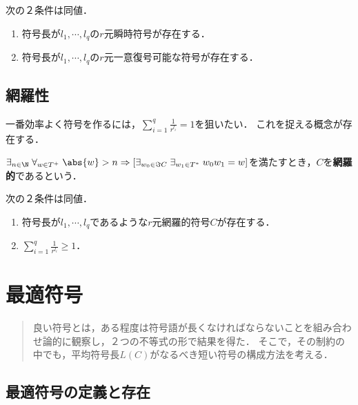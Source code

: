 \documentclass[uplatex,dvipdfmx]{jsreport}
\begin{document}
\begin{corollary}\mbox{}
    次の２条件は同値．
    \begin{enumerate}
        \item 符号長が$l_1,\cdots,l_q$の$r$元瞬時符号が存在する．
        \item 符号長が$l_1,\cdots,l_q$の$r$元一意復号可能な符号が存在する．
    \end{enumerate}
\end{corollary}

\section{網羅性}

\begin{tcolorbox}[colframe=ForestGreen, colback=ForestGreen!10!white,breakable,colbacktitle=ForestGreen!40!white,coltitle=black,fonttitle=\bfseries\sffamily,
title=]
    一番効率よく符号を作るには，$\sum^q_{i=1}\frac{1}{r^{l_i}}= 1$を狙いたい．
    これを捉える概念が存在する．
\end{tcolorbox}

\begin{definition}[exhaustive]
    $\exists_{n\in\N}\;\forall_{w\in T^+}\;\abs{w}>n\Rightarrow[\exists_{w_0\in\Im C}\;\exists_{w_1\in T^*}\;w_0w_1=w]$を満たすとき，$C$を\textbf{網羅的}であるという．
\end{definition}

\begin{theorem}
    次の２条件は同値．
    \begin{enumerate}
        \item 符号長が$l_1,\cdots,l_q$であるような$r$元網羅的符号$C$が存在する．
        \item $\sum^q_{i=1}\frac{1}{r^{l_i}}\ge 1$．
    \end{enumerate}
\end{theorem}

\chapter{最適符号}

\begin{quotation}
    良い符号とは，ある程度は符号語が長くなければならないことを組み合わせ論的に観察し，２つの不等式の形で結果を得た．
    そこで，その制約の中でも，平均符号長$L(C)$がなるべき短い符号の構成方法を考える．
\end{quotation}

\section{最適符号の定義と存在}
\end{document}
